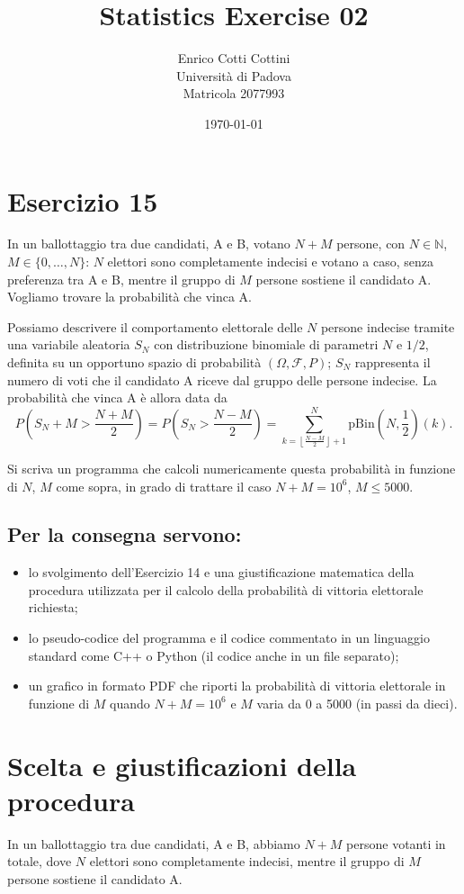 \documentclass{article}
\title{Statistics Exercise 02}
\author{Enrico Cotti Cottini \\ Università di Padova \\ Matricola 2077993}
\date{\today}
\begin{document}
\maketitle

\section{Esercizio 15 }
In un ballottaggio tra due candidati, A e B, votano $N + M$ persone, con $N \in \mathbb{N}$, $M \in \{0, \ldots, N\}$: $N$ elettori sono completamente indecisi e votano a caso, senza preferenza tra A e B, mentre il gruppo di $M$ persone sostiene il candidato A. Vogliamo trovare la probabilità che vinca A.

Possiamo descrivere il comportamento elettorale delle $N$ persone indecise tramite una variabile aleatoria $S_N$ con distribuzione binomiale di parametri $N$ e $1/2$, definita su un opportuno spazio di probabilità $(\Omega, \mathcal{F}, P)$; $S_N$ rappresenta il numero di voti che il candidato A riceve dal gruppo delle persone indecise. La probabilità che vinca A è allora data da
\[
P\left( S_N + M > \frac{N + M}{2} \right) = P\left( S_N > \frac{N - M}{2} \right) = \sum_{k = \left\lfloor \frac{N - M}{2} \right\rfloor + 1}^{N} \text{pBin}\left(N, \frac{1}{2}\right)(k).
\]

Si scriva un programma che calcoli numericamente questa probabilità in funzione di $N$, $M$ come sopra, in grado di trattare il caso $N + M = 10^6$, $M \leq 5000$.

\subsection*{Per la consegna servono:}
\begin{itemize}
    \item lo svolgimento dell'Esercizio 14 e una giustificazione matematica della procedura utilizzata per il calcolo della probabilità di vittoria elettorale richiesta;
    \item lo pseudo-codice del programma e il codice commentato in un linguaggio standard come C++ o Python (il codice anche in un file separato);
    \item un grafico in formato PDF che riporti la probabilità di vittoria elettorale in funzione di $M$ quando $N + M = 10^6$ e $M$ varia da 0 a 5000 (in passi da dieci).
\end{itemize}

\section{Scelta e giustificazioni della procedura}
In un ballottaggio tra due candidati, A e B, abbiamo $N + M$ persone votanti in totale, dove $N$ elettori sono completamente indecisi, mentre il gruppo di $M$ persone sostiene il candidato A.
\end{document}
